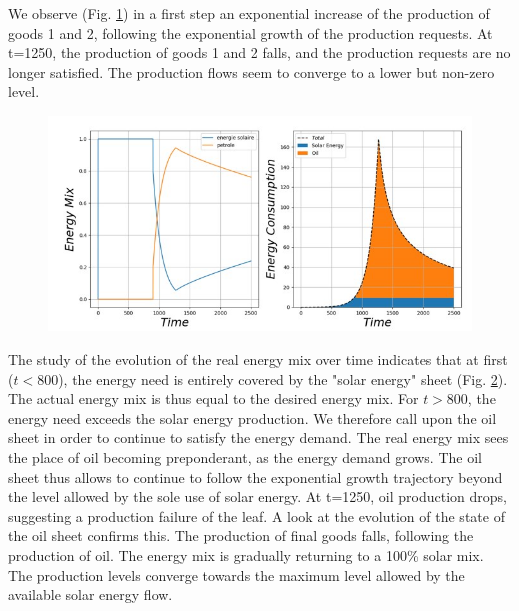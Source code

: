 \documentclass[12pt,a4paper]{article}%
\begin{document}
\begin{appendix}
\begin{figure}[h]
	\label{Fig11}
\end{figure} 
We observe (Fig. \ref{Fig11}) in a first step an exponential increase of the production of goods 1 and 2, following the exponential growth of the production requests. At t=1250, the production of goods 1 and 2 falls, and the production requests are no longer satisfied. The production flows seem to converge to a lower but non-zero level.  
\begin{figure}[h] 
	\centering 
	\includegraphics[width=1.0\textwidth]{figures/Energie12.jpg}
\label{Fig12}
\end{figure} 
The study of the evolution of the real energy mix over time indicates that at first ($t<800$), the energy need is entirely covered by the "solar energy" sheet (Fig. \ref{Fig12}). The actual energy mix is thus equal to the desired energy mix. For $t>800$, the energy need exceeds the solar energy production. We therefore call upon the oil sheet in order to continue to satisfy the energy demand. The real energy mix sees the place of oil becoming preponderant, as the energy demand grows. The oil sheet thus allows to continue to follow the exponential growth trajectory beyond the level allowed by the sole use of solar energy. At t=1250, oil production drops, suggesting a production failure of the leaf. A look at the evolution of the state of the oil sheet confirms this. The production of final goods falls, following the production of oil. The energy mix is gradually returning to a 100\% solar mix. The production levels converge towards the maximum level allowed by the available solar energy flow. 
 

\end{appendix}
\end{document}
